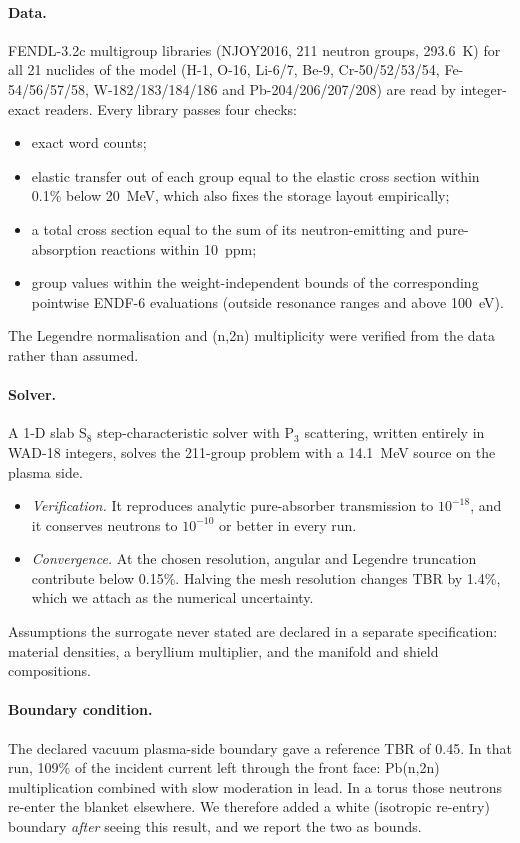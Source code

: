 \documentclass[11pt]{article}
\begin{document}
\paragraph{Data.} FENDL-3.2c multigroup libraries (NJOY2016, 211 neutron groups, 293.6~K) for all 21 nuclides
of the model (H-1, O-16, Li-6/7, Be-9, Cr-50/52/53/54, Fe-54/56/57/58, W-182/183/184/186 and
Pb-204/206/207/208) are read by integer-exact readers. Every library passes four checks:
\begin{itemize}[leftmargin=1.2em]
  \item exact word counts;
  \item elastic transfer out of each group equal to the elastic cross section within 0.1\% below 20~MeV, which
  also fixes the storage layout empirically;
  \item a total cross section equal to the sum of its neutron-emitting and pure-absorption reactions within
  10~ppm;
  \item group values within the weight-independent bounds of the corresponding pointwise ENDF-6 evaluations
  (outside resonance ranges and above 100~eV).
\end{itemize}
The Legendre normalisation and (n,2n) multiplicity were verified from the data rather than assumed.

\paragraph{Solver.} A 1-D slab S$_8$ step-characteristic solver with P$_3$ scattering, written entirely in
WAD-18 integers, solves the 211-group problem with a 14.1~MeV source on the plasma side.
\begin{itemize}[leftmargin=1.2em]
  \item \emph{Verification.} It reproduces analytic pure-absorber transmission to $10^{-18}$, and it conserves
  neutrons to $10^{-10}$ or better in every run.
  \item \emph{Convergence.} At the chosen resolution, angular and Legendre truncation contribute below 0.15\%.
  Halving the mesh resolution changes TBR by 1.4\%, which we attach as the numerical uncertainty.
\end{itemize}
Assumptions the surrogate never stated are declared in a separate specification: material densities, a
beryllium multiplier, and the manifold and shield compositions.

\paragraph{Boundary condition.} The declared vacuum plasma-side boundary gave a reference TBR of 0.45. In that
run, 109\% of the incident current left through the front face: Pb(n,2n) multiplication combined with slow
moderation in lead. In a torus those neutrons re-enter the blanket elsewhere. We therefore added a white
(isotropic re-entry) boundary \emph{after} seeing this result, and we report the two as bounds.
\end{document}
